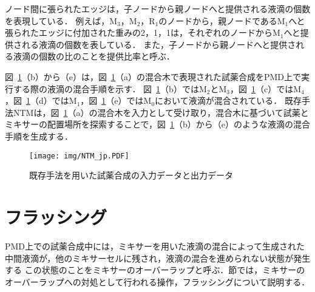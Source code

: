 ノード間に張られたエッジは，子ノードから親ノードへと提供される液滴の個数を表現している．
例えば，M$_3$，M$_2$，R$_1$のノードから，親ノードであるM$_1$へと張られたエッジに付加された重みの2，1，1は，それぞれのノードからM$_1$へと提供される液滴の個数を表している．
また，子ノードから親ノードへと提供される液滴の個数の比のことを提供比率と呼ぶ．

図~\ref{fig:NTM}（b）から（e）は，図~\ref{fig:NTM}（a）の混合木で表現された試薬合成をPMD上で実行する際の液滴の混合手順を示す．
図~\ref{fig:NTM}（b）ではM$_2$とM$_3$，図~\ref{fig:NTM}（c）ではM$_4$，図~\ref{fig:NTM}（d）ではM$_1$，図~\ref{fig:NTM}（e）ではM$_0$において液滴が混合されている．
既存手法NTMは，図~\ref{fig:NTM}（a）の混合木を入力として受け取り，混合木に基づいて試薬とミキサーの配置場所を探索することで，図~\ref{fig:NTM}（b）から（e）のような液滴の混合手順を生成する．

\begin{figure}[tbp]
    \centering\texttt{[image: img/NTM\_jp.PDF]}
    \caption{既存手法を用いた試薬合成の入力データと出力データ}\label{fig:NTM}
\end{figure}


\section{フラッシング}
\label{sec:flushing}
    PMD上での試薬合成中には，ミキサーを用いた液滴の混合によって生成された中間液滴が，他のミキサーセルに残され，液滴の混合を進められない状態が発生する
    この状態のことをミキサーのオーバーラップと呼ぶ．節では，ミキサーのオーバーラップへの対処として行われる操作，フラッシングについて説明する．
    
